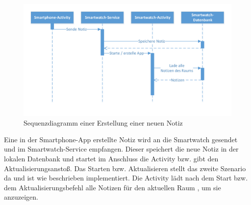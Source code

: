 \begin{figure}[H]
\centering
\includegraphics[width=1\linewidth]{../Bilder/SequenzdigrammNewNote}
\caption{Sequenzdiagramm einer Erstellung einer neuen Notiz}
\label{fig:SequenzdigrammNewNote}
\end{figure}

Eine in der Smartphone-App erstellte Notiz wird an die Smartwatch gesendet und im Smartwatch-Service empfangen. Dieser speichert die neue Notiz in der lokalen Datenbank und startet im Anschluss die Activity bzw. gibt den Aktualisierungsanstoß. Das Starten bzw. Aktualisieren stellt das zweite Szenario da und ist wie beschrieben implementiert. Die Activity lädt nach dem Start bzw. dem Aktualisierungsbefehl alle Notizen für den aktuellen Raum , um sie anzuzeigen. 